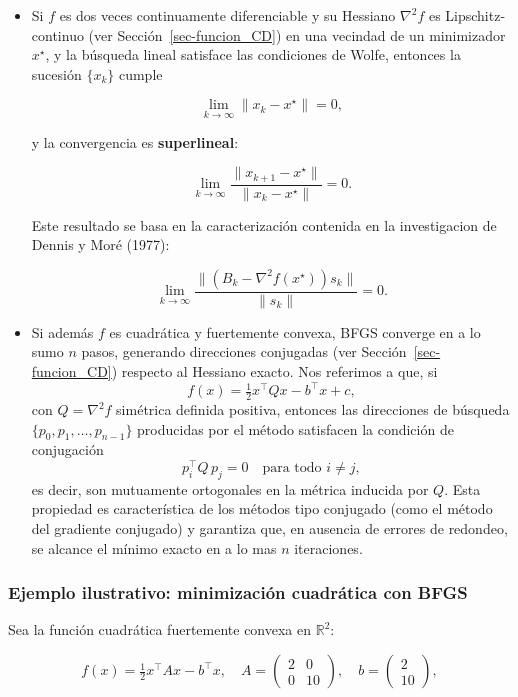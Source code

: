 \documentclass[
  spanish,
  us-letterpaper,
]{scrreprt}
\numberwithin{equation}{section}
\begin{document}
\begin{itemize}
\item
  Si \(f\) es dos veces continuamente diferenciable y su Hessiano
  \(\nabla^2 f\) es Lipschitz-continuo (ver
  Sección~\ref{sec-funcion_CD}) en una vecindad de un minimizador
  \(x^\star\), y la búsqueda lineal satisface las condiciones de Wolfe,
  entonces la sucesión \(\{x_k\}\) cumple

  \[
  \lim_{k \to \infty} \|x_k - x^\star\| = 0,
  \]

  y la convergencia es \textbf{superlineal}:

  \[
  \lim_{k \to \infty} \frac{\|x_{k+1} - x^\star\|}{\|x_k - x^\star\|} = 0.
  \]

  Este resultado se basa en la caracterización contenida en la
  investigacion de Dennis y Moré (1977):

  \[
  \lim_{k \to \infty} \frac{\|(B_k - \nabla^2 f(x^\star)) s_k\|}{\|s_k\|} = 0.
  \]
\item
  Si además \(f\) es cuadrática y fuertemente convexa, BFGS converge en
  a lo sumo \(n\) pasos, generando direcciones conjugadas (ver
  Sección~\ref{sec-funcion_CD}) respecto al Hessiano exacto. Nos
  referimos a que, si \[
  f(x) = \tfrac{1}{2} x^\top Q x - b^\top x + c,
  \] con \(Q = \nabla^2 f\) simétrica definida positiva, entonces las
  direcciones de búsqueda \(\{p_0, p_1, \dots, p_{n-1}\}\) producidas
  por el método satisfacen la condición de conjugación \[
  p_i^\top Q\, p_j = 0 \quad \text{para todo } i \neq j,
  \] es decir, son mutuamente ortogonales en la métrica inducida por
  \(Q\). Esta propiedad es característica de los métodos tipo conjugado
  (como el método del gradiente conjugado) y garantiza que, en ausencia
  de errores de redondeo, se alcance el mínimo exacto en a lo mas \(n\)
  iteraciones.
\end{itemize}

\subsubsection{Ejemplo ilustrativo: minimización cuadrática con
BFGS}\label{ejemplo-ilustrativo-minimizaciuxf3n-cuadruxe1tica-con-bfgs}

Sea la función cuadrática fuertemente convexa en \(\mathbb{R}^2\):

\[
f(x) = \tfrac{1}{2}x^\top A x - b^\top x,
\quad
A = \begin{pmatrix} 2 & 0 \\ 0 & 10 \end{pmatrix},
\quad
b = \begin{pmatrix} 2 \\ 10 \end{pmatrix},
\]
\end{document}
